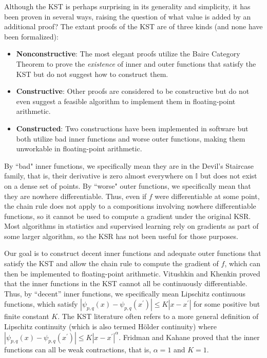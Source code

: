 Although the KST is perhaps surprising in its generality and simplicity, it has been proven in several ways, raising the question of what value is added by an additional proof? The extant proofs of the KST are of three kinds (and none have been formalized):

\begin{itemize}
    \item \textbf{Nonconstructive}: The most elegant proofs utilize the Baire Category Theorem to prove the \textit{existence} of inner and outer functions that satisfy the KST but do not suggest how to construct them.
    \item \textbf{Constructive}: Other proofs are considered to be constructive but do not even suggest a feasible algorithm to implement them in floating-point arithmetic.
    \item \textbf{Constructed}: Two constructions have been implemented in software but both utilize bad inner functions and worse outer functions, making them unworkable in floating-point arithmetic.
\end{itemize}

By ``bad" inner functions, we specifically mean they are in the Devil's Staircase family, that is, their derivative is zero almost everywhere on $\mathbb{I}$ but does not exist on a dense set of points. By ``worse" outer functions, we specifically mean that they are nowhere differentiable. Thus, even if $f$ were differentiable at some point, the chain rule does not apply to a compositions involving nowhere differentiable functions, so it cannot be used to compute a gradient under the original KSR. Most algorithms in statistics and supervised learning rely on gradients as part of some larger algorithm, so the KSR has not been useful for those purposes. 

Our goal is to construct decent inner functions and adequate outer functions that satisfy the KST and allow the chain rule to compute the gradient of $f$, which can then be implemented to floating-point arithmetic. Vitushkin and Khenkin proved that the inner functions in the KST cannot all be continuously differentiable. Thus, by ``decent'' inner functions, we specifically mean Lipschitz continuous functions, which satisfy $\left|\psi_{p,q}\left(x\right) - \psi_{p,q}\left(x^\prime\right)\right| \leq K\left|x - x^\prime\right|$ for some positive but finite constant $K$. The KST literature often refers to a more general definition of Lipschitz continuity (which is also termed H\"{o}lder continuity) where $\left|\psi_{p,q}\left(x\right) -   \psi_{p,q}\left(x^\prime\right)\right| \leq K\left|x - x^\prime\right|^\alpha$. Fridman and Kahane proved that the inner functions can all be weak contractions, that is, $\alpha = 1$ and $K = 1$.

